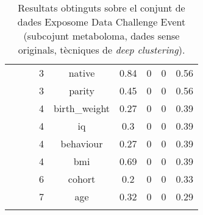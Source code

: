 \documentclass[CAT,BIB]{TFUOC}%
\begin{document}
\begin{center}
\begin{longtable}{@{}ccccccccc@{}}
            &  &  & 3 & native & 0.84 & 0 & 0 & 0.56 \\
            &  &  & 3 & parity & 0.45 & 0 & 0 & 0.56 \\
            &  &  & 4 & birth\_weight & 0.27 & 0 & 0 & 0.39 \\
            &  &  & 4 & iq & 0.3 & 0 & 0 & 0.39 \\
            &  &  & 4 & behaviour & 0.27 & 0 & 0 & 0.39 \\
            &  &  & 4 & bmi & 0.69 & 0 & 0 & 0.39 \\
            &  &  & 6 & cohort & 0.2 & 0 & 0 & 0.33 \\
            &  &  & 7 & age & 0.32 & 0 & 0 & 0.29 \\ \bottomrule
            \caption[Exposome Data Challenge Event: resultats - part 2]{
                Resultats obtinguts sobre el conjunt de dades Exposome Data Challenge Event
                (subcojunt metaboloma, dades sense originals, tècniques de \textit{deep clustering}).
            }
            \label{t:results_exposome2}
        \end{longtable}
    \end{center}
    \normalsize
\end{document}
